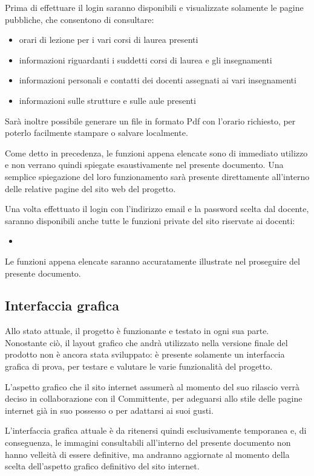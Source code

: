 \documentclass[11pt,a4paper]{article}
\begin{document}
Prima di effettuare il login saranno disponibili e visualizzate solamente le pagine pubbliche, che consentono di consultare:
\begin{itemize}
 \item orari di lezione per i vari corsi di laurea presenti
 \item informazioni riguardanti i suddetti corsi di laurea e gli insegnamenti
 \item informazioni personali e contatti dei docenti assegnati ai vari insegnamenti
 \item informazioni sulle strutture e sulle aule presenti
\end{itemize}
Sarà inoltre possibile generare un file in formato Pdf con l'orario richiesto, per poterlo facilmente stampare o salvare localmente.

Come detto in precedenza, le funzioni appena elencate sono di immediato utilizzo e non verrano quindi spiegate esaustivamente nel presente documento.
Una semplice spiegazione del loro funzionamento sarà presente direttamente all'interno delle relative pagine del sito web del progetto.

\bigskip
Una volta effettuato il login con l'indirizzo email e la password scelta dal docente, saranno disponibili anche tutte le funzioni private del sito riservate ai docenti:
\begin{itemize}
 \item 
\end{itemize}
Le funzioni appena elencate saranno accuratamente illustrate nel proseguire del presente documento.
\subsection{Interfaccia grafica}
Allo stato attuale, il progetto è funzionante e testato in ogni sua parte.
Nonostante ciò, il layout grafico che andrà utilizzato nella versione finale del prodotto non è ancora stata sviluppato: è presente solamente un interfaccia grafica di prova, per testare e valutare le varie funzionalità del progetto.

L'aspetto grafico che il sito internet assumerà al momento del suo rilascio verrà deciso in collaborazione con il Committente, per adeguarsi allo stile delle pagine internet già in suo possesso o per adattarsi ai suoi gusti.

L'interfaccia grafica attuale è da ritenersi quindi esclusivamente temporanea e, di conseguenza, le immagini consultabili all'interno del presente documento non hanno velleità di essere definitive, ma andranno aggiornate al momento della scelta dell'aspetto grafico definitivo del sito internet.
\end{document}

